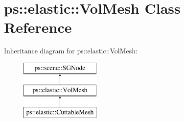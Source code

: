 \hypertarget{classps_1_1elastic_1_1VolMesh}{}\section{ps\+:\+:elastic\+:\+:Vol\+Mesh Class Reference}
\label{classps_1_1elastic_1_1VolMesh}
Inheritance diagram for ps\+:\+:elastic\+:\+:Vol\+Mesh\+:\begin{figure}[H]
\begin{center}
\leavevmode
\includegraphics[height=3.000000cm]{classps_1_1elastic_1_1VolMesh}
\end{center}
\end{figure}
